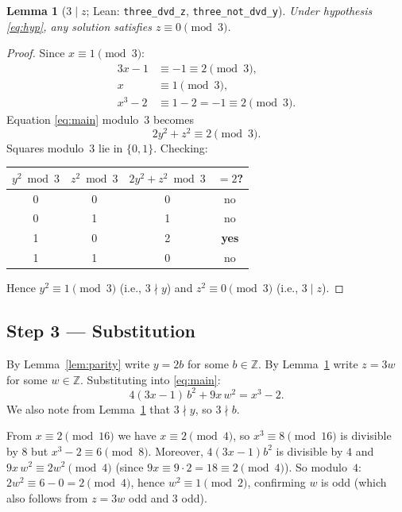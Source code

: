 \documentclass[12pt,a4paper]{article}
\newtheorem{lemma}[theorem]{Lemma}
\begin{document}
\begin{lemma}[$3 \mid z$; Lean: \texttt{three\_dvd\_z}, \texttt{three\_not\_dvd\_y}]\label{lem:3divz}
Under hypothesis \eqref{eq:hyp}, any solution satisfies $z \equiv 0 \pmod 3$.
\end{lemma}

\begin{proof}
Since $x \equiv 1 \pmod 3$:
\begin{align*}
  3x-1 &\equiv -1 \equiv 2 \pmod 3,\\
  x     &\equiv 1 \pmod 3,\\
  x^3-2 &\equiv 1-2 = -1 \equiv 2 \pmod 3.
\end{align*}
Equation \eqref{eq:main} modulo~$3$ becomes
\[
  2y^2 + z^2 \equiv 2 \pmod 3.
\]
Squares modulo~$3$ lie in $\{0,1\}$. Checking:
\begin{center}
\begin{tabular}{cc|c|c}
  $y^2\bmod3$ & $z^2\bmod3$ & $2y^2+z^2\bmod3$ & $= 2$? \\
  \hline
  0 & 0 & 0 & no \\
  0 & 1 & 1 & no \\
  1 & 0 & 2 & \textbf{yes} \\
  1 & 1 & 0 & no \\
\end{tabular}
\end{center}
Hence $y^2 \equiv 1 \pmod 3$ (i.e., $3 \nmid y$) and $z^2 \equiv 0 \pmod
3$ (i.e., $3 \mid z$).
\end{proof}

\subsection{Step 3 --- Substitution}

By Lemma~\ref{lem:parity} write $y = 2b$ for some $b \in \mathbb{Z}$.
By Lemma~\ref{lem:3divz} write $z = 3w$ for some $w \in \mathbb{Z}$.
Substituting into \eqref{eq:main}:
\begin{equation}\label{eq:sub1}
  4(3x-1)\,b^2 + 9x\,w^2 = x^3 - 2.
\end{equation}
We also note from Lemma~\ref{lem:3divz} that $3 \nmid y$, so $3\nmid b$.

From $x \equiv 2 \pmod{16}$ we have $x \equiv 2 \pmod 4$, so $x^3 \equiv 8
\pmod{16}$ is divisible by $8$ but $x^3 - 2 \equiv 6 \pmod 8$.  Moreover,
$4(3x-1)b^2$ is divisible by $4$ and $9x\,w^2 \equiv 2w^2 \pmod 4$ (since
$9x \equiv 9\cdot2 = 18 \equiv 2 \pmod 4$).  So modulo~$4$: $2w^2 \equiv
6-0=2\pmod4$, hence $w^2 \equiv 1 \pmod 2$, confirming $w$ is odd (which also
follows from $z = 3w$ odd and $3$ odd).
\end{document}
